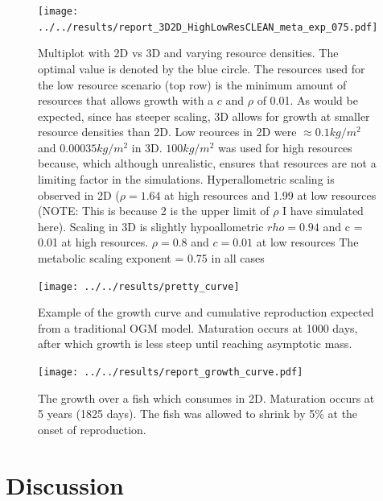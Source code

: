 \documentclass[a4paper, 11pt, hidelinks]{article} %
\begin{document}
	\begin{figure}[h!]
		

		\centering
		\texttt{[image: ../../results/report\_3D2D\_HighLowResCLEAN\_meta\_exp\_075.pdf]}
		
		\caption{Multiplot with 2D vs 3D and varying resource densities. The optimal value is denoted by the blue circle.
			The resources used for the low resource scenario (top row) is the minimum amount of resources that allows growth with a $c$ and $\rho$ of 0.01.  As would be expected, since has steeper scaling, 3D allows for growth at smaller resource densities than 2D.
			Low reources in 2D were $ \approx 0.1kg/m^2 $ and $ 0.00035kg/m^2 $ in 3D.
			$ 100kg/m^2 $ was used for high resources because, which although unrealistic, ensures that resources are not a limiting factor in the simulations.
			Hyperallometric scaling is observed in 2D ($\rho = 1.64$ at high resources and 1.99 at low resources (NOTE: This is because 2 is the upper limit of $\rho$ I have simulated here). 
			Scaling in 3D is slightly hypoallometric $rho = 0.94$ and c = 0.01 at high resources. $\rho = 0.8$ and $c = 0.01$ at low resources
			The metabolic scaling exponent = 0.75 in all cases}
		\label{resources2D3D_meta_exp0.75}
	\end{figure}
			
	\begin{figure}
		\centering %
		\texttt{[image: ../../results/pretty\_curve]}
		\caption{Example of the growth curve and cumulative reproduction expected from a traditional OGM model. Maturation occurs at 1000 days, after which growth is less steep until reaching asymptotic mass.  }
		\label{OGM_Curve}
	\end{figure}
	
	\begin{figure}
		
		\texttt{[image: ../../results/report\_growth\_curve.pdf]}
		\caption{The growth over a fish which consumes in 2D.  Maturation occurs at 5 years (1825 days).  The fish was allowed to shrink by 5\% at the onset of reproduction.}
		\label{growth_curve}
	\end{figure}



	\nolinenumbers
	
\section{Discussion}
	\linenumbers
	
\end{document}
